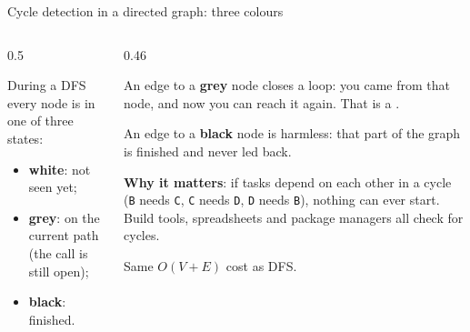 \documentclass[aspectratio=169,10pt]{beamer}
\begin{document}
\begin{frame}{Cycle detection in a directed graph: three colours}
\begin{columns}[T]
\begin{column}{0.5\textwidth}
\begin{sfig}[0.5]
\end{sfig}
{\small
During a DFS every node is in one of three states:
\begin{itemize}\setlength\itemsep{1pt}
\item \textbf{white}: not seen yet;
\item \textbf{grey}: on the current path (the call is still open);
\item \textbf{black}: finished.
\end{itemize}}
\end{column}
\begin{column}{0.46\textwidth}
{\small
An edge to a \textbf{grey} node closes a loop: you came from that node, and now you can reach it again. That is a .

\vspace{2mm}
An edge to a \textbf{black} node is harmless: that part of the graph is finished and never led back.

\vspace{2mm}
\textbf{Why it matters}: if tasks depend on each other in a cycle (\texttt{B} needs \texttt{C}, \texttt{C} needs \texttt{D}, \texttt{D} needs \texttt{B}), nothing can ever start. Build tools, spreadsheets and package managers all check for cycles.

\vspace{2mm}
Same $O(V+E)$ cost as DFS.}
\end{column}
\end{columns}
\end{frame}
\end{document}
